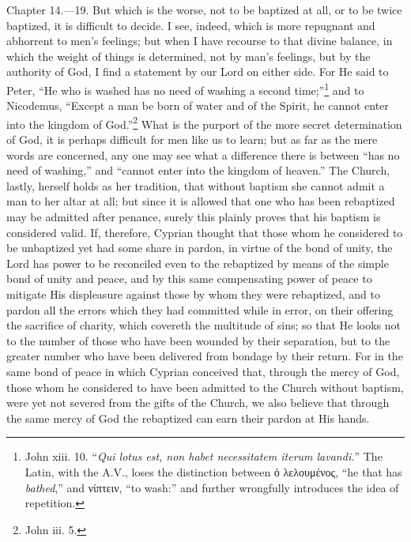 Chapter 14.—19. But which is the worse, not to be baptized at all, or to be twice baptized, it is difficult to decide. I see, indeed, which is more repugnant and abhorrent to men’s feelings; but when I have recourse to that divine balance, in which the weight of things is determined, not by man’s feelings, but by the authority of God, I find a statement by our Lord on either side. For He said to Peter, ``He who is washed has no need of washing a second time;''\footnote{\par  John xiii. 10. ``\emph{Qui lotus est, non habet necessitatem iterum lavandi.}'' The Latin, with the A.V., loses the distinction between \textgreek{ὁ λελουμένος}, ``he that has \emph{bathed},'' and \textgreek{νίπτειν}, ``to wash:'' and further wrongfully introduces the idea of repetition.} and to Nicodemus, ``Except a man be born of water and of the Spirit, he cannot enter into the kingdom of God.''\footnote{\par  John iii. 5.} What is the purport of the more secret determination of God, it is perhaps difficult for men like us to learn; but as far as the mere words are concerned, any one may see what a difference there is between ``has no need of washing,'' and ``cannot enter into the kingdom of heaven.'' The Church, lastly, herself holds as her tradition, that without baptism she cannot admit a man to her altar at all; but since it is allowed that one who has been rebaptized may be admitted after penance, surely this plainly proves that his baptism is considered valid. If, therefore, Cyprian thought that those whom he considered to be unbaptized yet had some share in pardon, in virtue of the bond of unity, the Lord has power to be reconciled even to the rebaptized by means of the simple bond of unity and peace, and by this same compensating power of peace to mitigate His displeasure against those by whom they were rebaptized, and to pardon all the errors which they had committed while in error, on their offering the sacrifice of charity, which covereth the multitude of sins; so that He looks not to the number of those who have been wounded by their separation, but to the greater number who have been delivered from bondage by their return. For in the same bond of peace in which Cyprian conceived that, through the mercy of God, those whom he considered to have been admitted to the Church without baptism, were yet not severed from the gifts of the Church, we also believe that through the same mercy of God the rebaptized can earn their pardon at His hands.



